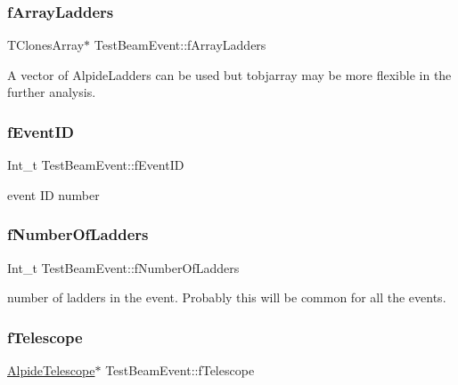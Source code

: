 \subsubsection{\texorpdfstring{f\+Array\+Ladders}{fArrayLadders}}
{\footnotesize\ttfamily T\+Clones\+Array$\ast$ Test\+Beam\+Event\+::f\+Array\+Ladders\hspace{0.3cm}{\ttfamily [private]}}

A vector of Alpide\+Ladders can be used but tobjarray may be more flexible in the further analysis. \mbox{\label{class_test_beam_event_a1282488fec26d6b83901407e75378dda}} 
\subsubsection{\texorpdfstring{f\+Event\+ID}{fEventID}}
{\footnotesize\ttfamily Int\+\_\+t Test\+Beam\+Event\+::f\+Event\+ID\hspace{0.3cm}{\ttfamily [private]}}

event ID number \mbox{\label{class_test_beam_event_aca631326d6c05616a55cc16349c8b339}} 
\subsubsection{\texorpdfstring{f\+Number\+Of\+Ladders}{fNumberOfLadders}}
{\footnotesize\ttfamily Int\+\_\+t Test\+Beam\+Event\+::f\+Number\+Of\+Ladders\hspace{0.3cm}{\ttfamily [private]}}

number of ladders in the event. Probably this will be common for all the events. \mbox{\label{class_test_beam_event_ade24f88970804477d66d35d6e5acfb98}} 
\subsubsection{\texorpdfstring{f\+Telescope}{fTelescope}}
{\footnotesize\ttfamily \mbox{\hyperlink{class_alpide_telescope}{Alpide\+Telescope}}$\ast$ Test\+Beam\+Event\+::f\+Telescope\hspace{0.3cm}{\ttfamily [private]}}

